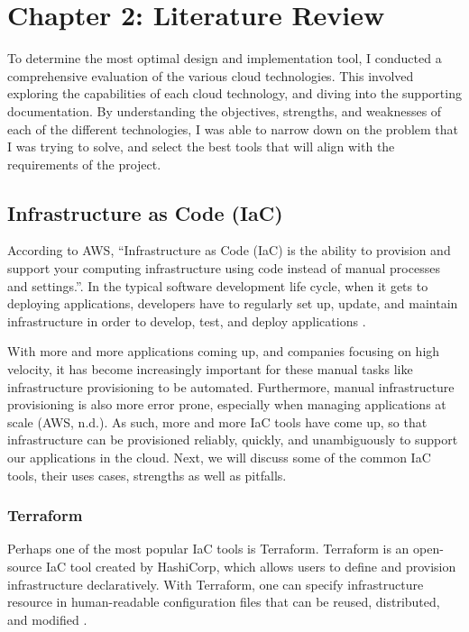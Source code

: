 \chapter{Chapter 2: Literature Review}
To determine the most optimal design and implementation tool, I conducted a comprehensive evaluation of the various cloud technologies. This involved exploring the capabilities of each cloud technology, and diving into the supporting documentation. By understanding the objectives, strengths, and weaknesses of each of the different technologies, I was able to narrow down on the problem that I was trying to solve, and select the best tools that will align with the requirements of the project.

\section{Infrastructure as Code (IaC)}
According to AWS, “Infrastructure as Code (IaC) is the ability to provision and support your computing infrastructure using code instead of manual processes and settings.”. In the typical software development life cycle, when it gets to deploying applications, developers have to regularly set up, update, and maintain infrastructure in order to develop, test, and deploy applications \cite{aws-iac}. 

With more and more applications coming up, and companies focusing on high velocity, it has become increasingly important for these manual tasks like infrastructure provisioning to be automated. Furthermore, manual infrastructure provisioning is also more error prone, especially when managing applications at scale (AWS, n.d.). As such, more and more IaC tools have come up, so that infrastructure can be provisioned reliably, quickly, and unambiguously to support our applications in the cloud. Next, we will discuss some of the common IaC tools, their uses cases, strengths as well as pitfalls. 



\subsection{Terraform}
Perhaps one of the most popular IaC tools is Terraform. Terraform is an open-source IaC tool created by HashiCorp, which allows users to define and provision infrastructure declaratively. With Terraform, one can specify infrastructure resource in human-readable configuration files that can be reused, distributed, and modified \cite{cloud-2023}. 


